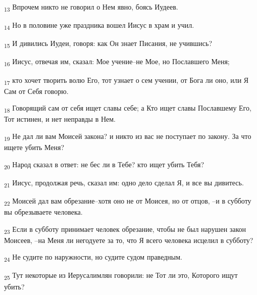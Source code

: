 \begin{tcolorbox}
\textsubscript{13} Впрочем никто не говорил о Нем явно, боясь Иудеев.
\end{tcolorbox}
\begin{tcolorbox}
\textsubscript{14} Но в половине уже праздника вошел Иисус в храм и учил.
\end{tcolorbox}
\begin{tcolorbox}
\textsubscript{15} И дивились Иудеи, говоря: как Он знает Писания, не учившись?
\end{tcolorbox}
\begin{tcolorbox}
\textsubscript{16} Иисус, отвечая им, сказал: Мое учение--не Мое, но Пославшего Меня;
\end{tcolorbox}
\begin{tcolorbox}
\textsubscript{17} кто хочет творить волю Его, тот узнает о сем учении, от Бога ли оно, или Я Сам от Себя говорю.
\end{tcolorbox}
\begin{tcolorbox}
\textsubscript{18} Говорящий сам от себя ищет славы себе; а Кто ищет славы Пославшему Его, Тот истинен, и нет неправды в Нем.
\end{tcolorbox}
\begin{tcolorbox}
\textsubscript{19} Не дал ли вам Моисей закона? и никто из вас не поступает по закону. За что ищете убить Меня?
\end{tcolorbox}
\begin{tcolorbox}
\textsubscript{20} Народ сказал в ответ: не бес ли в Тебе? кто ищет убить Тебя?
\end{tcolorbox}
\begin{tcolorbox}
\textsubscript{21} Иисус, продолжая речь, сказал им: одно дело сделал Я, и все вы дивитесь.
\end{tcolorbox}
\begin{tcolorbox}
\textsubscript{22} Моисей дал вам обрезание--хотя оно не от Моисея, но от отцов, --и в субботу вы обрезываете человека.
\end{tcolorbox}
\begin{tcolorbox}
\textsubscript{23} Если в субботу принимает человек обрезание, чтобы не был нарушен закон Моисеев, --на Меня ли негодуете за то, что Я всего человека исцелил в субботу?
\end{tcolorbox}
\begin{tcolorbox}
\textsubscript{24} Не судите по наружности, но судите судом праведным.
\end{tcolorbox}
\begin{tcolorbox}
\textsubscript{25} Тут некоторые из Иерусалимлян говорили: не Тот ли это, Которого ищут убить?
\end{tcolorbox}
